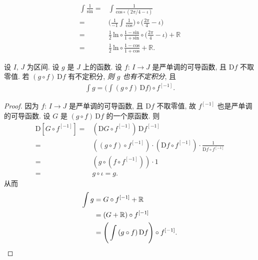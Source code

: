 \begin{example}
    \begin{align*}
        \int {\frac{1}{\mathrm{sin}}}
        = {} & \int {\frac{1}{\mathrm{cos} \circ (2\pi/4 - \iota)}}                     \\
        = {} & \Bigg( \frac{1}{-1} \int {\frac{1}{\mathrm{cos}}} \Bigg)
        \circ \bigg( \frac{2\pi}{4} - \iota \bigg)                                      \\
        = {} & \frac{1}{2}\,\mathrm{ln} \circ
        \frac{1 - \mathrm{sin}}{1 + \mathrm{sin}} \circ
        \bigg( \frac{2\pi}{4} - \iota \bigg) + \mathbb{R}                               \\
        = {} & \frac{1}{2}\,\mathrm{ln} \circ \frac{1 - \mathrm{cos}}{1 + \mathrm{cos}}
        + \mathbb{R}.
    \end{align*}
\end{example}

\begin{theorem}
    设 $I$, $J$ 为区间.
    设 $g$ 是 $J$ 上的函数.
    设 $f$: $I \to J$ 是严单调的可导函数,
    且 $\mathrm{D}f$ 不取零值.
    若 $(g \circ f)\,\mathrm{D}f$ 有不定积分,
    \emph{则 $g$ 也有不定积分}, 且
    \begin{align*}
        \int {g} = \Bigg( \int {(g \circ f)\,\mathrm{D}f} \Bigg) \circ f^{[-1]}.
    \end{align*}
\end{theorem}

\begin{proof}
    因为 $f$: $I \to J$ 是严单调的可导函数,
    且 $\mathrm{D}f$ 不取零值,
    故 $f^{[-1]}$ 也是严单调的可导函数.
    设 $G$ 是 $(g \circ f)\,\mathrm{D}f$ 的一个原函数.
    则
    \begin{align*}
        \mathrm{D}[G \circ f^{[-1]}]
        = {} & (\mathrm{D}G \circ f^{[-1]})\, \mathrm{D}f^{[-1]}                                                         \\
        = {} & ((g \circ f)\circ f^{[-1]}) \cdot (\mathrm{D}f \circ f^{[-1]}) \cdot \frac{1}{\mathrm{D}f \circ f^{[-1]}} \\
        = {} & (g \circ (f \circ f^{[-1]})) \cdot 1                                                                      \\
        = {} & g \circ \iota = g.
    \end{align*}
    从而
    \begin{align*}
        \int {g}
        = {} & G \circ f^{[-1]} + \mathbb{R}                                          \\
        = {} & (G + \mathbb{R}) \circ f^{[-1]}                                        \\
        = {} & \Bigg( \int {(g \circ f)\,\mathrm{D}f} \Bigg) \circ f^{[-1]}. \qedhere
    \end{align*}
\end{proof}

